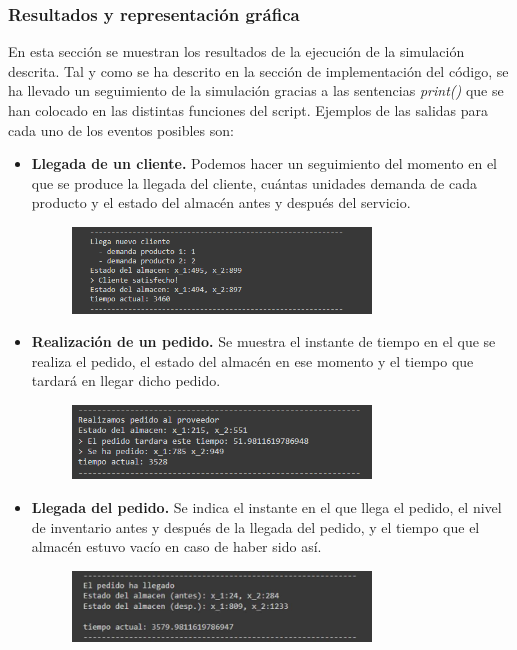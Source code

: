 \documentclass[a4paper,12pt]{article}
\begin{document}
	\subsubsection{Resultados y representación gráfica}
	En esta sección se muestran los resultados de la ejecución de la simulación descrita. Tal y como
	se ha descrito en la sección de implementación del código, se ha llevado un seguimiento de la
	simulación gracias a las sentencias \textit{print()} que se han colocado en las distintas funciones del script.
Ejemplos de las salidas para cada uno de los eventos posibles son:
	\begin{itemize}
		\item \textbf{Llegada de un cliente.} Podemos hacer un seguimiento del momento en el que se produce
la llegada del cliente, cuántas unidades demanda de cada producto y el estado del almacén
antes y después del servicio.
		\begin{figure}[H]
			\centering
			\includegraphics[width=0.75\textwidth]{include/llegada_cliente.png}
		\end{figure}
		
		\item \textbf{Realización de un pedido.} Se muestra el instante de tiempo en el que se realiza el pedido,
el estado del almacén en ese momento y el tiempo que tardará en llegar dicho pedido.
		\begin{figure}[H]
			\centering
			\includegraphics[width=0.75\textwidth]{include/realizacion_pedido.png}
		\end{figure}
	
	
		\item \textbf{Llegada del pedido.} Se indica el instante en el que llega el pedido, el nivel de inventario
 antes y después de la llegada del pedido, y el tiempo que el almacén estuvo vacío en caso
de haber sido así.
		\begin{figure}[H]
			\centering
			\includegraphics[width=0.75\textwidth]{include/llegada_pedido.png}
		\end{figure}
		
	\end{itemize}
\end{document}
